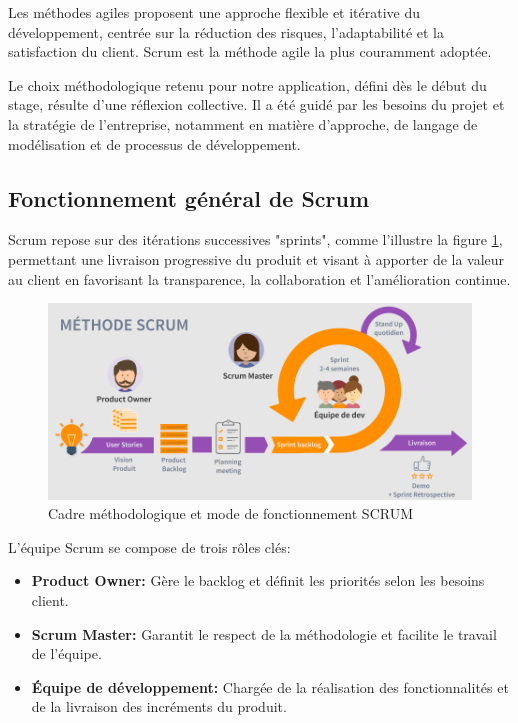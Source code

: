 Les méthodes agiles proposent une approche flexible et itérative du développement, centrée sur la réduction des risques, l’adaptabilité et la satisfaction du client. Scrum est la méthode agile la plus couramment adoptée\cite{agile}.

Le choix méthodologique retenu pour notre application, défini dès le début du stage, résulte d’une réflexion collective. Il a été guidé par les besoins du projet et la stratégie de l’entreprise, notamment en matière d’approche, de langage de modélisation et de processus de développement.
\subsection{Fonctionnement général de Scrum\cite{Scrum}}
Scrum repose sur des itérations successives "sprints", comme l’illustre la figure \ref{fig:Scrum}, permettant une livraison progressive du produit et visant à apporter de la valeur au client en favorisant la transparence, la collaboration et l’amélioration continue.
\begin{figure}[H]
    \centering
    \includegraphics[width=\linewidth]{chapitres/ch1/img/scrum.PNG}
    \caption{Cadre méthodologique et mode de fonctionnement SCRUM \cite{ScrumImg}}
    \label{fig:Scrum}
\end{figure}
\vspace{-0.5cm}
L’équipe Scrum se compose de trois rôles clés:
\begin{itemize}[label=$\bullet$]
    \item \textbf{Product Owner:} Gère le backlog et définit les priorités selon les besoins client.
    \item \textbf{Scrum Master:} Garantit le respect de la méthodologie et facilite le travail de l’équipe.
    \item \textbf{Équipe de développement:} Chargée de la réalisation des fonctionnalités et de la livraison des incréments du produit.
\end{itemize}

